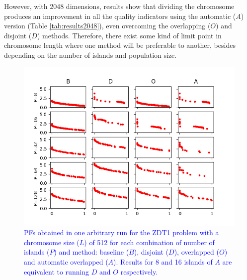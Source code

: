 \documentclass[preprint]{elsarticle}
\begin{document}
However, with 2048 dimensions, results show that dividing the chromosome produces an improvement in all the quality indicators using the automatic ($A$) version (Table \ref{tab:results2048}), even overcoming the overlapping ($O$) and disjoint ($D$) methods. Therefore, there exist some kind of limit point in chromosome length where one method will be preferable to another, besides depending on the number of islands and population size.

\begin{figure}
\centering
\includegraphics[width=12cm]{plot_zdt1_512.png}
\caption{\textcolor{blue}{PFs obtained in one arbitrary run for the ZDT1 problem with a chromosome size ($L$) of 512 for each combination of number of islands ($P$) and method: baseline ($B$), disjoint ($D$), overlapped ($O$) and automatic overlapped ($A$). Results for 8 and 16 islands of $A$ are equivalent to running $D$ and $O$ respectively. }}
\label{fig:plot_zdt1_512}
\end{figure}
\end{document}
